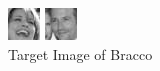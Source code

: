 \documentclass[12pt]{article} %
\begin{document}
\begin{figure}[H] %
  \centering 
  \begin{minipage}[b]{0.2\textwidth}
    \includegraphics[width=\textwidth]{part3_3_2_correct_bracco}
    \caption{Target Image of Bracco}
  \end{minipage}
  \begin{minipage}[b]{0.1\textwidth}
    \includegraphics[width=\textwidth]{part3_3_2_error1_vartan}

\end{minipage}
\end{figure}
\end{document}
